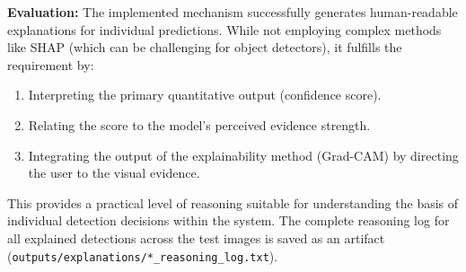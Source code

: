 \textbf{Evaluation:}
The implemented mechanism successfully generates human-readable explanations for individual predictions. While not employing complex methods like SHAP (which can be challenging for object detectors), it fulfills the requirement by:
\begin{enumerate}
    \item  Interpreting the primary quantitative output (confidence score).
    \item  Relating the score to the model's perceived evidence strength.
    \item  Integrating the output of the explainability method (Grad-CAM) by directing the user to the visual evidence.
\end{enumerate}
This provides a practical level of reasoning suitable for understanding the basis of individual detection decisions within the system. The complete reasoning log for all explained detections across the test images is saved as an artifact (\texttt{outputs/explanations/*\_reasoning\_log.txt}).


